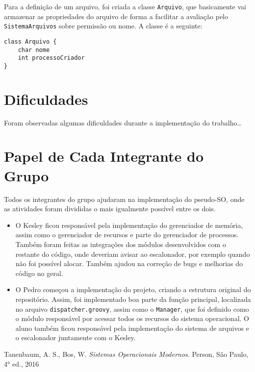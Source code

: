 \documentclass[12pt]{article}
\begin{document}
Para a definição de um arquivo, foi criada a classe \texttt{Arquivo}, que basicamente vai armazenar as propriedades do arquivo de forma a facilitar a avaliação pelo \texttt{SistemaArquivos} sobre permissão ou nome. A classe é a seguinte:

\begin{verbatim}
class Arquivo {
    char nome
    int processoCriador
}
\end{verbatim}

\section{Dificuldades}
Foram observadas algumas dificuldades durante a implementação do trabalho\dots

\section{Papel de Cada Integrante do Grupo}
Todos os integrantes do grupo ajudaram na implementação do pseudo-SO, onde as atividades foram divididas o mais igualmente possível entre os dois. 

\begin{itemize}
    \item O Kesley ficou responsável pela implementação do gerenciador de memória, assim como o gerenciador de recursos e parte do gerenciador de processos. Também foram feitas as integrações dos módulos desenvolvidos com o restante do código, onde deveriam avisar ao escalonador, por exemplo quando não foi possível alocar. Também ajudou na correção de bugs e melhorias do código no geral.
    \item O Pedro começou a implementação do projeto, criando a estrutura original do repositório. Assim, foi implementado boa parte da função principal, localizada no arquivo \texttt{dispatcher.groovy}, assim como o \texttt{Manager}, que foi definido como o módulo responsável por acessar todos os recursos do sistema operacional. O aluno também ficou responsável pela implementação do sistema de arquivos e o escalonador juntamente com o Kesley.
\end{itemize}

\begin{thebibliography}{00}
     Tanenbaum, A. S., Bos, W. \textit{Sistemas Operacionais Modernos}. Person, São Paulo, 4° ed., 2016
\end{thebibliography}
\end{document}
